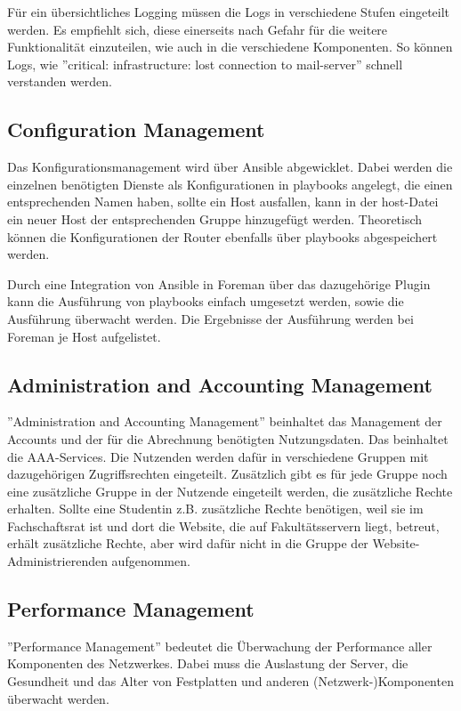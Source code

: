 Für ein übersichtliches Logging müssen die Logs in verschiedene Stufen eingeteilt werden. Es empfiehlt sich, diese einerseits nach Gefahr für die weitere Funktionalität einzuteilen, wie auch in die verschiedene Komponenten. So können Logs, wie ''critical: infrastructure: lost connection to mail-server'' schnell verstanden werden.

\subsection{Configuration Management}
Das Konfigurationsmanagement wird über Ansible abgewicklet. Dabei werden die einzelnen benötigten Dienste als Konfigurationen in playbooks angelegt, die einen entsprechenden Namen haben, sollte ein Host ausfallen, kann in der host-Datei ein neuer Host der entsprechenden Gruppe hinzugefügt werden. Theoretisch können die Konfigurationen der Router ebenfalls über playbooks abgespeichert werden. 

Durch eine Integration von Ansible in Foreman über das dazugehörige Plugin kann die Ausführung von playbooks einfach umgesetzt werden, sowie die Ausführung überwacht werden. Die Ergebnisse der Ausführung werden bei Foreman je Host aufgelistet.

\subsection{Administration and Accounting Management}
''Administration and Accounting Management'' beinhaltet das Management der Accounts und der für die Abrechnung benötigten Nutzungsdaten. Das beinhaltet die AAA-Services. Die Nutzenden werden dafür in verschiedene Gruppen mit dazugehörigen Zugriffsrechten eingeteilt. Zusätzlich gibt es für jede Gruppe noch eine zusätzliche Gruppe in der Nutzende eingeteilt werden, die zusätzliche Rechte erhalten. Sollte eine Studentin z.B. zusätzliche Rechte benötigen, weil sie im Fachschaftsrat ist und dort die Website, die auf Fakultätsservern liegt, betreut, erhält zusätzliche Rechte, aber wird dafür nicht in die Gruppe der Website-Administrierenden aufgenommen.


\subsection{Performance Management}
''Performance Management'' bedeutet die Überwachung der Performance aller Komponenten des Netzwerkes. Dabei muss die Auslastung der Server, die Gesundheit und das Alter von Festplatten und anderen (Netzwerk-)Komponenten überwacht werden.

